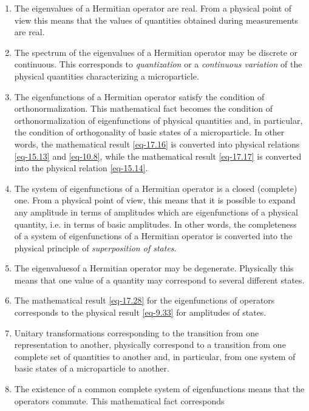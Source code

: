 \documentclass[a4paper,sfsidenotes,colorlinks=true]{tufte-book}
\numberwithin{equation}{section}
\numberwithin{figure}{section}
\begin{document}
\begin{enumerate}[label=(\arabic*), leftmargin=1cm]
\item The eigenvalues of a Hermitian operator are real. From a
  physical point of view this means that the values of quantities
  obtained during measurements are real.

\item The spectrum of the eigenvalues of a Hermitian operator may be
  discrete or continuous. This corresponds to \emph{quantization} or a
  \emph{continuous variation} of the physical quantities
  characterizing a microparticle.

\item The eigenfunctions of a Hermitian operator satisfy the condition
  of orthonormalization. This mathematical fact becomes the condition
  of orthonormalization of eigenfunctions of physical quantities and,
  in particular, the condition of orthogonality of basic states of a
  microparticle. In other words, the mathematical result \ref{eq-17.16} is
  converted into physical relations \ref{eq-15.13} and \ref{eq-10.8}, while the
  mathematical result \ref{eq-17.17} is converted into the physical relation
  \ref{eq-15.14}.
\item The system of eigenfunctions of a Hermitian operator is a closed
  (complete) one. From a physical point of view, this means that it is
  possible to expand any amplitude in terms of amplitudes which are
  eigenfunctions of a physical quantity, i.e. in terms of basic
  amplitudes. In other words, the completeness of a system of
  eigenfunctions of a Hermitian operator is converted into the
  physical principle of \emph{superposition of states}.
\item The eigenvaluesof a Hermitian operator may be
  degenerate. Physically this means that one value of a quantity may
  correspond to several different states.
\item The mathematical result \ref{eq-17.28} for the eigenfunctions of
  operators corresponds to the physical result \ref{eq-9.33} for
  amplitudes of states.
\item Unitary transformations corresponding to the transition from
  one representation to another, physically correspond to a
  transition from one complete set of quantities to another and, in
  particular, from one system of basic states of a microparticle to
  another.
\item The existence of a common complete system of eigenfunctions
  means that the operators commute. This mathematical fact corresponds

\end{enumerate}
\end{document}
